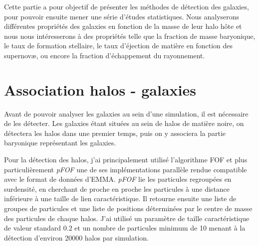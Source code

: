 
Cette partie a pour objectif de présenter les méthodes de détection des galaxies, pour pouvoir ensuite mener une série d'études statistiques.
Nous analyserons différentes propriétés des galaxies en fonction de la masse de leur halo hôte et nous nous intéresserons à des propriétés telle que la fraction de masse baryonique, le taux de formation stellaire, le taux d'éjection de matière en fonction des supernovæ, ou encore la fraction d'échappement du rayonnement.


\section{Association halos - galaxies}


Avant de pouvoir analyser les galaxies au sein d'une simulation, il est nécessaire de les détecter.
Les galaxies étant situées au sein de halos de matière noire, on détectera les halos dans une premier temps, puis on y associera la partie baryonique représentant les galaxies.

Pour la détection des halos, j'ai principalement utilisé l’algorithme \ac{FOF} et plus particulièrement \textit{pFOF} une de ses implémentations parallèle \citep{2014A&A...564A..13R} rendue compatible avec le format de données d'EMMA.
\textit{pFOF} lie les particules regroupées en surdensité, en cherchant de proche en proche les particules à une distance inférieure à une taille de lien caractéristique.
Il retourne ensuite une liste de groupes de particules et une liste de positions déterminées par le centre de masse des particules de chaque halos.
J'ai utilisé un paramètre de taille caractéristique de valeur standard $0.2$ et un nombre de particules minimum de 10 menant à la détection d'environ 20000 halos par simulation.


